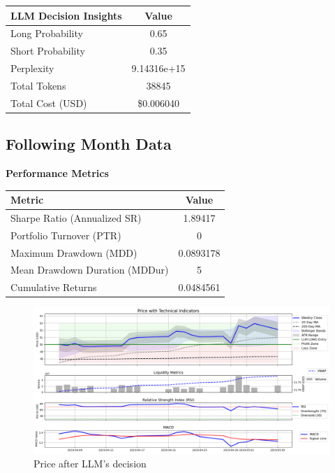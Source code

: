 \documentclass[8pt]{scrartcl}
\begin{document}
\begin{longtable}{l c}
\toprule
\textbf{LLM Decision Insights} & \textbf{Value} \\
\midrule
Long Probability & 0.65 \\
Short Probability & 0.35 \\
Perplexity & 9.14316e+15 \\
\midrule
Total Tokens & 38845 \\
Total Cost (USD) & \$0.006040 \\
\bottomrule
\end{longtable}

\subsection*{Following Month Data}

\textbf{Performance Metrics}

\begin{longtable}{l c}
\toprule
\textbf{Metric} & \textbf{Value} \\
\midrule
Sharpe Ratio (Annualized SR) & 1.89417 \\
Portfolio Turnover (PTR) & 0 \\
Maximum Drawdown (MDD) & 0.0893178 \\
Mean Drawdown Duration (MDDur) & 5 \\
Cumulative Returns & 0.0484561 \\
\bottomrule
\end{longtable}


\begin{figure}[H]
    \centering
    \includegraphics[width=1\linewidth]{judge_reviews//AAPL_M_gpt-4o-mini/2019-04-07/llm_Price_with_Technical_Indicators.png}
    \caption{Price after LLM's decision}
\end{figure}
\end{document}

